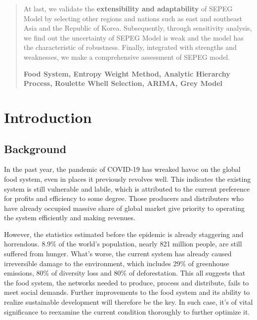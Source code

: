 \documentclass{mcmthesis}
\begin{document}
\begin{abstract}
At last, we validate the \textbf{extensibility and adaptability} of SEPEG Model by selecting other regions and nations such as east and southeast Asia and the Republic of Korea. Subsequently, through sensitivity analysis, we find out the uncertainty of SEPEG Model is weak and the model has the characteristic of robustness. Finally, integrated with strengths and weaknesses, we make a comprehensive assessment of SEPEG model.
\\
	\begin{keywords}
	\textbf{Food System, Entropy Weight Method, Analytic Hierarchy Process, Roulette Whell Selection, ARIMA, Grey Model}
	\end{keywords}
\end{abstract}

\maketitle
\tableofcontents

\newpage
\section{Introduction}

\subsection{Background}

In the past year, the pandemic of COVID-19 has wreaked havoc on the global food system, even in places it previously revolves well. This indicates the existing system is still vulnerable and labile, which is
attributed to the current preference for profits and efficiency to some degree. Those producers and distributers who have already occupied massive share of global market give priority to operating the system efficiently and making revenues.

However, the statistics estimated before the epidemic is already staggering and horrendous. 8.9$\%$ of the world's population, nearly 821 million people, are still suffered from hunger. What's worse, the current system has already caused irreversible damage to the environment, which includes 29$\%$ of greenhouse emissions, 80$\%$ of diversity loss and 80$\%$ of deforestation\cite{statistics}. This all suggests that the food system, the networks needed to produce, process and distribute, fails to meet social demands. Further improvements to the food system and its ability to realize sustainable development will therefore be the key. In such case, it's of vital significance to reexamine the current condition thoroughly to further optimize it.
\end{document}
